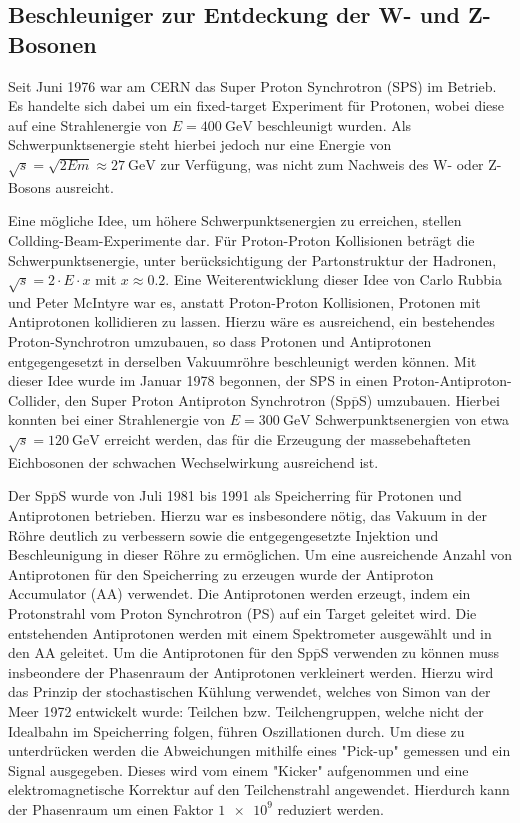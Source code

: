\subsection{Beschleuniger zur Entdeckung der W- und Z-Bosonen}
Seit Juni 1976 war am CERN das Super Proton Synchrotron (SPS) im Betrieb.
Es handelte sich dabei um ein fixed-target Experiment für Protonen, wobei diese auf eine Strahlenergie von $E = \SI{400}{\giga\electronvolt}$ beschleunigt wurden.
Als Schwerpunktsenergie steht hierbei jedoch nur eine Energie von $\sqrt{s} = \sqrt{2 E m} \approx \SI{27}{\giga\electronvolt}$ zur Verfügung, was nicht zum Nachweis des W- oder Z-Bosons ausreicht.

Eine mögliche Idee, um höhere Schwerpunktsenergien zu erreichen, stellen Collding-Beam-Experimente dar.
Für Proton-Proton Kollisionen beträgt die Schwerpunktsenergie, unter berücksichtigung der Partonstruktur der Hadronen, $\sqrt{s} = 2 \cdot E \cdot x$ mit $x \approx \num{0.2}$.
Eine Weiterentwicklung dieser Idee von Carlo Rubbia und Peter McIntyre war es, anstatt Proton-Proton Kollisionen, Protonen mit Antiprotonen kollidieren zu lassen.
Hierzu wäre es ausreichend, ein bestehendes Proton-Synchrotron umzubauen, so dass Protonen und Antiprotonen entgegengesetzt in derselben Vakuumröhre beschleunigt werden können.
Mit dieser Idee wurde im Januar 1978 begonnen, der SPS in einen Proton-Antiproton-Collider, den Super Proton Antiproton Synchrotron (Sp$\overline{\text{p}}$S) umzubauen.
Hierbei konnten bei einer Strahlenergie von $E = \SI{300}{\giga\electronvolt}$ Schwerpunktsenergien von etwa $\sqrt{s} = \SI{120}{\giga\electronvolt}$ erreicht werden, das für die Erzeugung der massebehafteten Eichbosonen der schwachen Wechselwirkung ausreichend ist.

Der Sp$\overline{\text{p}}$S wurde von Juli 1981 bis 1991 als Speicherring für Protonen und Antiprotonen betrieben.
Hierzu war es insbesondere nötig, das Vakuum in der Röhre deutlich zu verbessern sowie die entgegengesetzte Injektion und Beschleunigung in dieser Röhre zu ermöglichen.
Um eine ausreichende Anzahl von Antiprotonen für den Speicherring zu erzeugen wurde der Antiproton Accumulator (AA) verwendet.
Die Antiprotonen werden erzeugt, indem ein Protonstrahl vom Proton Synchrotron (PS) auf ein Target geleitet wird.
Die entstehenden Antiprotonen werden mit einem Spektrometer ausgewählt und in den AA geleitet.
Um die Antiprotonen für den Sp$\overline{\text{p}}$S verwenden zu können muss insbeondere der Phasenraum der Antiprotonen verkleinert werden.
Hierzu wird das Prinzip der stochastischen Kühlung verwendet, welches von Simon van der Meer 1972 entwickelt wurde:
Teilchen bzw. Teilchengruppen, welche nicht der Idealbahn im Speicherring folgen, führen Oszillationen durch.
Um diese zu unterdrücken werden die Abweichungen mithilfe eines "Pick-up" gemessen und ein Signal ausgegeben.
Dieses wird vom einem "Kicker" aufgenommen und eine elektromagnetische Korrektur auf den Teilchenstrahl angewendet.
Hierdurch kann der Phasenraum um einen Faktor $\num{1e9}$ reduziert werden.

